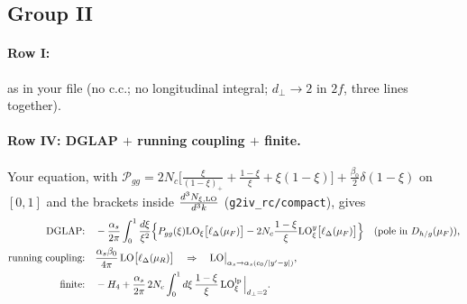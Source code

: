 \documentclass[10pt]{article}
\numberwithin{equation}{section}
\newcommand{\LO}{{\rm LO}}
\begin{document}
\subsection{Group II}
\paragraph{Row I:} as in your file (no c.c.; no longitudinal integral; $d_\perp\to2$ in $2f$, three lines together).
\paragraph{Row IV: DGLAP $+$ running coupling $+$ finite.} Your equation, with $\mathcal P_{gg}=2N_c\big[\frac{\xi}{(1-\xi)_+}+\frac{1-\xi}{\xi}+\xi(1-\xi)\big]+\frac{\beta_0}{2}\delta(1-\xi)$ on $[0,1]$ and the brackets inside $\frac{d^3N_{\xi,\rm LO}}{d^3k}$ (\texttt{g2iv\_rc/compact}), gives
\begin{align}
\text{DGLAP:}&\quad-\frac{\alpha_s}{2\pi}\int_0^1\frac{d\xi}{\xi^2}\Big\{P_{gg}(\xi)\LO_\xi\big[\ell_\Delta(\mu_F)\big]-2N_c\frac{1-\xi}{\xi}\LO^{y}_\xi\big[\ell_\Delta(\mu_F)\big]\Big\}\quad(\text{pole in }D_{h/g}(\mu_F)),\label{eq:dglap}\\
\text{running coupling:}&\quad\frac{\alpha_s\beta_0}{4\pi}\,\LO\big[\ell_\Delta(\mu_R)\big]\quad\Rightarrow\quad\LO\big|_{\alpha_s\to\alpha_s(c_0/|y'-y|)},\label{eq:rc}\\
\text{finite:}&\quad-H_4+\frac{\alpha_s}{2\pi}\,2N_c\int_0^1d\xi\,\frac{1-\xi}{\xi}\,\LO^{\rm lp}_\xi\,\Big|_{d_\perp=2}.\label{eq:G2IVfin}
\end{align}
\end{document}
